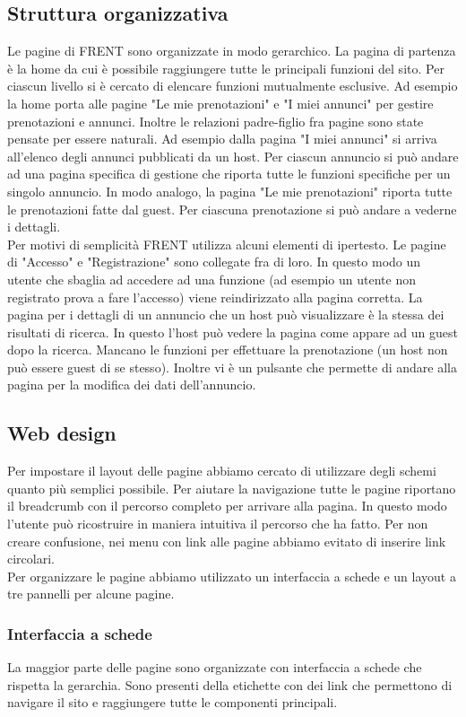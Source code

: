 \documentclass[1_relazione.tex]{subfiles}
\begin{document}
\subsection{Struttura organizzativa}
Le pagine di FRENT sono organizzate in modo gerarchico. La pagina di partenza è la home da cui è possibile raggiungere tutte le principali funzioni del sito. Per ciascun livello si è cercato di elencare funzioni mutualmente esclusive. Ad esempio la home porta alle pagine "Le mie prenotazioni" e "I miei annunci" per gestire prenotazioni e annunci. Inoltre le relazioni padre-figlio fra pagine sono state pensate per essere naturali. Ad esempio dalla pagina "I miei annunci" si arriva all'elenco degli annunci pubblicati da un host. Per ciascun annuncio si può andare ad una pagina specifica di gestione che riporta tutte le funzioni specifiche per un singolo annuncio. In modo analogo, la pagina "Le mie prenotazioni" riporta tutte le prenotazioni fatte dal guest. Per ciascuna prenotazione si può andare a vederne i dettagli. \\
Per motivi di semplicità FRENT utilizza alcuni elementi di ipertesto. Le pagine di "Accesso" e "Registrazione" sono collegate fra di loro. In questo modo un utente che sbaglia ad accedere ad una funzione (ad esempio un utente non registrato prova a fare l'accesso) viene reindirizzato alla pagina corretta. 
La pagina per i dettagli di un annuncio che un host può visualizzare è la stessa dei risultati di ricerca. In questo l'host può vedere la pagina come appare ad un guest dopo la ricerca. Mancano le funzioni per effettuare la prenotazione (un host non può essere guest di se stesso). Inoltre vi è un pulsante che permette di andare alla pagina per la modifica dei dati dell'annuncio.

\subsection{Web design}
Per impostare il layout delle pagine abbiamo cercato di utilizzare degli schemi quanto più semplici possibile. Per aiutare la navigazione tutte le pagine riportano il breadcrumb con il percorso completo per arrivare alla pagina. In questo modo l'utente può ricostruire in maniera intuitiva il percorso che ha fatto. Per non creare confusione, nei menu con link alle pagine abbiamo evitato di inserire link circolari. \\
Per organizzare le pagine abbiamo utilizzato un interfaccia a schede e un layout a tre pannelli per alcune pagine.

\subsubsection{Interfaccia a schede} 
La maggior parte delle pagine sono organizzate con interfaccia a schede che rispetta la gerarchia. Sono presenti della etichette con dei link che permettono di navigare il sito e raggiungere tutte le componenti principali.
\end{document}
